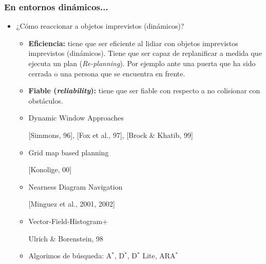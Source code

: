 \begin{frame}
    \frametitle{En entornos dinámicos...}
    
    \begin{itemize}
        \item ¿Cómo reaccionar a objetos imprevistos (dinámicos)?
        \begin{itemize}
            \item \textbf{Eficiencia:} tiene que ser eficiente al lidiar con objetos imprevistos imprevistos (dinámicos). Tiene que ser capaz de replanificar a medida que ejecuta un plan (\emph{Re-planning}). Por ejemplo ante una puerta que ha sido cerrada o una persona que se encuentra en frente.
            \item \textbf{Fiable (\emph{reliability}):} tiene que ser fiable con respecto a no colisionar con obstáculos.
        \end{itemize}
        
        \begin{itemize}
            \item Dynamic Window Approaches
            
            {\scriptsize [Simmons, 96], [Fox et al., 97], [Brock \& Khatib, 99]}
            \item Grid map based planning
            
            {\scriptsize [Konolige, 00]}
            
            \item Nearness Diagram Navigation
            
            {\scriptsize [Minguez et al., 2001, 2002]}
            
            \item Vector-Field-Histogram+
            
            {\scriptsize Ulrich \& Borenstein, 98}
            
            \item Algorimos de búsqueda: A$^{*}$, D$^{*}$, D$^{*}$ Lite, ARA$^{*}$
            
        \end{itemize}
        
    \end{itemize}
    
\end{frame}

